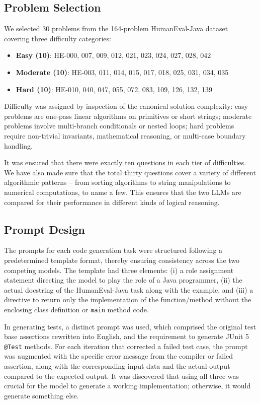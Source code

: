 \documentclass[journal]{IEEEtran}
\begin{document}
\subsection{Problem Selection}
We selected 30 problems from the 164-problem HumanEval-Java
dataset~\cite{humaneval-x} covering three difficulty categories:

\begin{itemize}
\item \textbf{Easy (10)}: HE-000, 007, 009, 012, 021, 023, 024, 027, 028, 042
\item \textbf{Moderate (10)}: HE-003, 011, 014, 015, 017, 018, 025, 031, 034, 035
\item \textbf{Hard (10)}: HE-010, 040, 047, 055, 072, 083, 109, 126, 132, 139
\end{itemize}

Difficulty was assigned by inspection of the canonical solution complexity:
easy problems are one-pass linear algorithms on primitives or short strings;
moderate problems involve multi-branch conditionals or nested loops; hard
problems require non-trivial invariants, mathematical reasoning, or
multi-case boundary handling.

It was ensured that there were exactly ten questions in each tier of difficulties. We have also made sure that the total thirty questions cover a variety of different algorithmic patterns – from sorting algorithms to string manipulations to numerical computations, to name a few. This ensures that the two LLMs are compared for their performance in different kinds of logical reasoning.

\subsection{Prompt Design}
\label{sec:prompt}
The prompts for each code generation task were structured following a predetermined template format, thereby ensuring consistency across the two competing models. The template had three elements: (i) a role assignment statement directing the model to play the role of a Java programmer, (ii) the actual docstring of the HumanEval-Java task along with the example, and (iii) a directive to return only the implementation of the function/method without the enclosing class definition or \texttt{main} method code.

In generating tests, a distinct prompt was used, which comprised the original test base assertions rewritten into English, and the requirement to generate JUnit 5 \texttt{@Test} methods. For each iteration that corrected a failed test case, the prompt was augmented with the specific error message from the compiler or failed assertion, along with the corresponding input data and the actual output compared to the expected output. It was discovered that using all three was crucial for the model to generate a working implementation; otherwise, it would generate something else.
\end{document}
